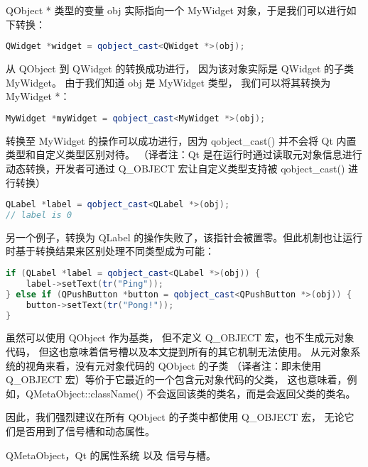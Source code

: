 QObject * 类型的变量 obj 实际指向一个 MyWidget 对象，于是我们可以进行如下转换：

\begin{lstlisting}[language=C++]
QWidget *widget = qobject_cast<QWidget *>(obj);
\end{lstlisting}

从 QObject 到 QWidget 的转换成功进行，
因为该对象实际是 QWidget 的子类 MyWidget。
由于我们知道 obj 是 MyWidget 类型，
我们可以将其转换为 MyWidget *：

\begin{lstlisting}[language=C++]
MyWidget *myWidget = qobject_cast<MyWidget *>(obj);
\end{lstlisting}

转换至 MyWidget 的操作可以成功进行，因为 qobject\_cast() 并不会将 Qt 内置类型和自定义类型区别对待。
（译者注：Qt 是在运行时通过读取元对象信息进行动态转换，开发者可通过 Q\_OBJECT 宏让自定义类型支持被 qobject\_cast() 进行转换）

\begin{lstlisting}[language=C++]
QLabel *label = qobject_cast<QLabel *>(obj);
// label is 0
\end{lstlisting}

另一个例子，转换为 QLabel 的操作失败了，该指针会被置零。但此机制也让运行时基于转换结果来区别处理不同类型成为可能：

\begin{lstlisting}[language=C++]
if (QLabel *label = qobject_cast<QLabel *>(obj)) {
    label->setText(tr("Ping"));
} else if (QPushButton *button = qobject_cast<QPushButton *>(obj)) {
    button->setText(tr("Pong!"));
}
\end{lstlisting}

虽然可以使用 QObject 作为基类，
但不定义 Q\_OBJECT 宏，也不生成元对象代码，
但这也意味着信号槽以及本文提到所有的其它机制无法使用。
从元对象系统的视角来看，没有元对象代码的 QObject 的子类
（译者注：即未使用 Q\_OBJECT 宏）等价于它最近的一个包含元对象代码的父类，
这也意味着，例如，QMetaObject::className() 不会返回该类的类名，而是会返回父类的类名。

因此，我们强烈建议在所有 QObject 的子类中都使用 Q\_OBJECT 宏，
无论它们是否用到了信号槽和动态属性。

\begin{seeAlso}
QMetaObject，Qt 的属性系统 以及 信号与槽。
\end{seeAlso}